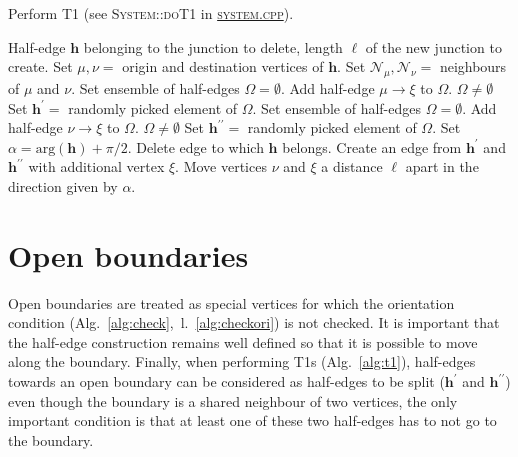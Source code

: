 \documentclass[aps, superscriptaddress, notitlepage, longbibliography]{revtex4-1}
\begin{document}
\begin{algorithm}[H]
\caption{Perform T1 (see \textsc{System::doT1} in \href{../system.cpp}{\textsc{system.cpp}}).}
\label{alg:t1}
\begin{algorithmic}[1]
\REQUIRE Half-edge $\boldsymbol{h}$ belonging to the junction to delete, length $\ell$ of the new junction to create.
\STATE Set $\mu, \nu =$ origin and destination vertices of $\boldsymbol{h}$.
\STATE Set $\mathcal{N}_{\mu}, \mathcal{N}_{\nu} =$ neighbours of $\mu$ and $\nu$. 
\STATE Set ensemble of half-edges $\Omega = \emptyset$.
        \STATE Add half-edge $\mu \to \xi$ to $\Omega$.
    \ENDIF
\ENDFOR
\ASSERT $\Omega \neq \emptyset$
\STATE Set $\boldsymbol{h}^{\prime} =$ randomly picked element of $\Omega$.
\STATE Set ensemble of half-edges $\Omega = \emptyset$.
        \STATE Add half-edge $\nu \to \xi$ to $\Omega$.
    \ENDIF
\ENDFOR
\ASSERT $\Omega \neq \emptyset$
\STATE Set $\boldsymbol{h}^{\prime\prime} =$ randomly picked element of $\Omega$.
\STATE Set $\alpha = \mathrm{arg}(\boldsymbol{h}) + \pi/2$.
\STATE Delete edge to which $\boldsymbol{h}$ belongs. 
\STATE Create an edge from $\boldsymbol{h}^{\prime}$ and $\boldsymbol{h}^{\prime\prime}$ with additional vertex $\xi$. 
\STATE Move vertices $\nu$ and $\xi$ a distance $\ell$ apart in the direction given by $\alpha$.
\end{algorithmic}
\end{algorithm}

\section{Open boundaries}

Open boundaries are treated as special vertices for which the orientation condition (Alg.~\ref{alg:check},~l.~\ref{alg:checkori}) is not checked. It is important that the half-edge construction remains well defined so that it is possible to move along the boundary. Finally, when performing T1s (Alg.~\ref{alg:t1}), half-edges towards an open boundary can be considered as half-edges to be split ($\boldsymbol{h}^{\prime}$ and $\boldsymbol{h}^{\prime\prime}$) even though the boundary is a shared neighbour of two vertices, the only important condition is that at least one of these two half-edges has to not go to the boundary.
\end{document}
